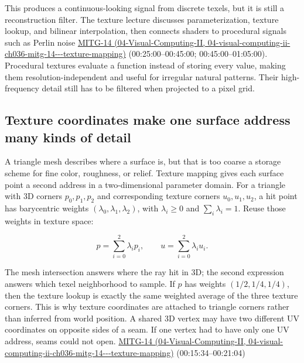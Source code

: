 This produces a continuous-looking signal from discrete texels, but it is still a reconstruction filter. The texture lecture discusses parameterization, texture lookup, and bilinear interpolation, then connects shaders to procedural signals such as Perlin noise \href{../04-Visual-Computing-II/main.pdf\#nameddest=04-visual-computing-ii-ch036-mitg-14---texture-mapping}{MITG-14 (04-Visual-Computing-II, 04-visual-computing-ii-ch036-mitg-14-\/-\/-texture-mapping)} (00:25:00--00:45:00; 00:45:00--01:05:00). Procedural textures evaluate a function instead of storing every value, making them resolution-independent and useful for irregular natural patterns. Their high-frequency detail still has to be filtered when projected to a pixel grid.

\subsection{Texture coordinates make one surface address many kinds of detail}\label{03-visual-computing-i-ch019-texture-coordinates-make-one-surface-address-many-kinds-of-detail}

A triangle mesh describes where a surface is, but that is too coarse a storage scheme for fine color, roughness, or relief. Texture mapping gives each surface point a second address in a two-dimensional parameter domain. For a triangle with 3D corners \(p_0,p_1,p_2\) and corresponding texture corners \(u_0,u_1,u_2\), a hit point has barycentric weights \((\lambda_0,\lambda_1,\lambda_2)\), with \(\lambda_i\ge 0\) and \(\sum_i\lambda_i=1\). Reuse those weights in texture space:

\[
p=\sum_{i=0}^2\lambda_i p_i,\qquad u=\sum_{i=0}^2\lambda_i u_i.
\]

The mesh intersection answers where the ray hit in 3D; the second expression answers which texel neighborhood to sample. If \(p\) has weights \((1/2,1/4,1/4)\), then the texture lookup is exactly the same weighted average of the three texture corners. This is why texture coordinates are attached to triangle corners rather than inferred from world position. A shared 3D vertex may have two different UV coordinates on opposite sides of a seam. If one vertex had to have only one UV address, seams could not open. \href{../04-Visual-Computing-II/main.pdf\#nameddest=04-visual-computing-ii-ch036-mitg-14---texture-mapping}{MITG-14 (04-Visual-Computing-II, 04-visual-computing-ii-ch036-mitg-14-\/-\/-texture-mapping)} (00:15:34--00:21:04)

